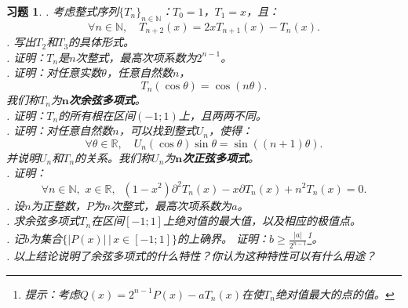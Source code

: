 \documentclass[12pt,UTF8]{ctexbook}
\theoremstyle{definition}
\theoremstyle{plain}
\newtheorem{xt}{习题}[section]
\begin{document}
\begin{appendix}
\begin{xt}
    . 考虑整式序列$\{T_n\}_{n\in\mathbb{N}}$：$T_0 = 1$，$T_1 = x$，且：
    $$ \forall n\in\mathbb{N}, \quad T_{n+2}(x) = 2xT_{n+1}(x) - T_n(x).$$
    . 写出$T_2$和$T_3$的具体形式。\\
    . 证明：$T_n$是$n$次整式，最高次项系数为$2^{n-1}$。\\
    . 证明：对任意实数$\theta$，任意自然数$n$，
    $$ T_n(\cos{\theta}) = \cos{(n\theta)}.$$
    我们称$T_n$为$\boldsymbol{n}$\textbf{次余弦多项式}。\\
    . 证明：$T_n$的所有根在区间$(-1;1)$上，且两两不同。\\
    . 证明：对任意自然数$n$，可以找到整式$U_n$，使得：
    $$ \forall \theta \in \mathbb{R}, \quad U_n(\cos{\theta}) \sin{\theta} = \sin{((n+1)\theta)}. $$
    并说明$U_n$和$T_n$的关系。我们称$U_n$为$\boldsymbol{n}$\textbf{次正弦多项式}。\\
    . 证明：
    $$ \forall n\in\mathbb{N},\,\, x\in\mathbb{R}, \;\; (1 - x^2)\partial^2 T_n(x) - x\partial T_n(x) + n^2 T_n(x) = 0.$$
    . 设$n$为正整数，$P$为$n$次整式，最高次项系数为$a$。\\
    . 求余弦多项式$T_n$在区间$[-1;1]$上绝对值的最大值，以及相应的极值点。\\
    . 记$b$为集合$\{|P(x)| \, | \, x\in[-1;1]\}$的上确界。
    证明：$b \geqslant \frac{|a|}{2^{n-1}}$\footnote{提示：考虑$Q(x) = 2^{n-1}P(x) - aT_n(x)$在使$T_n$绝对值最大的点的值。}。\\
    . 以上结论说明了余弦多项式的什么特性？你认为这种特性可以有什么用途？
\end{xt}
\end{appendix}
\end{document}
